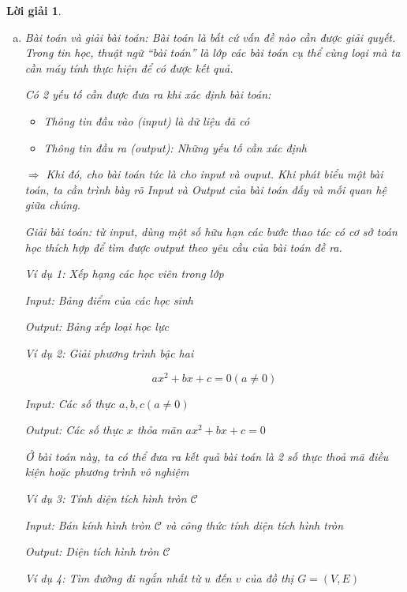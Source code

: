 \documentclass[14pt, a4paper]{article}
\theoremstyle{sltheorem}
\theoremstyle{soltheorem}
\newtheorem*{loigiai}{Lời giải}
\begin{document}
    \begin{loigiai}

        \begin{enumerate}[a)]
            \item Bài toán và giải bài toán:
            Bài toán là bất cứ vấn đề nào cần được giải quyết. Trong tin học, thuật ngữ “bài toán” là lớp các bài toán cụ thể cùng loại mà ta cần máy tính thực hiện để có được kết quả.

            Có 2 yếu tố cần được đưa ra khi xác định bài toán:
            \begin{itemize}
                \item Thông tin đầu vào (input) là dữ liệu đã có
                \item Thông tin đầu ra (output): Những yếu tố cần xác định
            \end{itemize}
            $\Rightarrow$ Khi đó, cho bài toán tức là cho input và ouput. Khi phát biểu một bài toán, ta cần trình bày rõ Input và Output của bài toán đấy và mối quan hệ giữa chúng.
            
            Giải bài toán: từ input, dùng một số hữu hạn các bước thao tác có cơ sở toán học thích hợp để tìm được output theo yêu cầu của bài toán đề ra.

            Ví dụ 1: Xếp hạng các học viên trong lớp

            Input: Bảng điểm của các học sinh

            Output: Bảng xếp loại học lực

            Ví dụ 2: Giải phương trình bậc hai

            \begin{equation*}
                a x^2 + bx + c = 0 (a \neq 0)
            \end{equation*}

            Input: Các số thực $a, b, c (a \neq 0)$

            Output: Các số thực $x$ thỏa mãn $ax^2 + bx + c = 0$

            Ở bài toán này, ta có thể đưa ra kết quả bài toán là 2 số thực thoả mã điều kiện hoặc phương trình vô nghiệm

            Ví dụ 3: Tính diện tích hình tròn $\mathcal{C}$

            Input: Bán kính hình tròn $\mathcal{C}$ và công thức tính diện tích hình tròn

            Output: Diện tích hình tròn $\mathcal{C}$

            Ví dụ 4: Tìm đường đi ngắn nhất từ $u$ đến $v$ của đồ thị $G=(V, E)$


\end{enumerate}
\end{loigiai}
\end{document}
